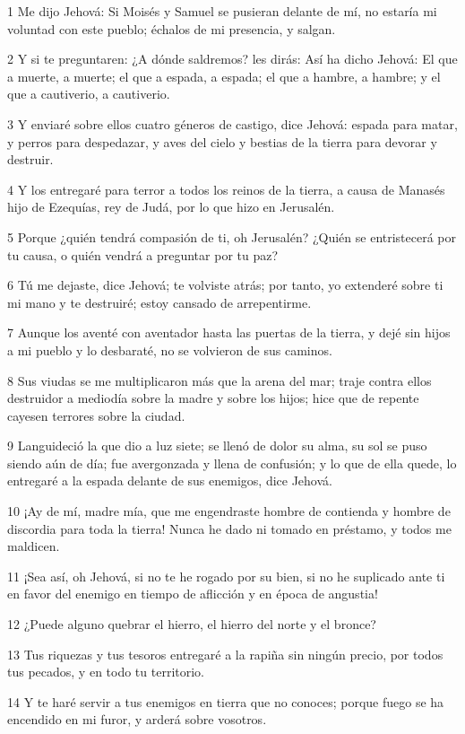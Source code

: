 \par 1 Me dijo Jehová: Si Moisés y Samuel se pusieran delante de mí, no estaría mi voluntad con este pueblo; échalos de mi presencia, y salgan.
\par 2 Y si te preguntaren: ¿A dónde saldremos? les dirás: Así ha dicho Jehová: El que a muerte, a muerte; el que a espada, a espada; el que a hambre, a hambre; y el que a cautiverio, a cautiverio. 
\par 3 Y enviaré sobre ellos cuatro géneros de castigo, dice Jehová: espada para matar, y perros para despedazar, y aves del cielo y bestias de la tierra para devorar y destruir. 
\par 4 Y los entregaré para terror a todos los reinos de la tierra, a causa de Manasés hijo de Ezequías, rey de Judá, por lo que hizo en Jerusalén. 
\par 5 Porque ¿quién tendrá compasión de ti, oh Jerusalén? ¿Quién se entristecerá por tu causa, o quién vendrá a preguntar por tu paz?
\par 6 Tú me dejaste, dice Jehová; te volviste atrás; por tanto, yo extenderé sobre ti mi mano y te destruiré; estoy cansado de arrepentirme.
\par 7 Aunque los aventé con aventador hasta las puertas de la tierra, y dejé sin hijos a mi pueblo y lo desbaraté, no se volvieron de sus caminos.
\par 8 Sus viudas se me multiplicaron más que la arena del mar; traje contra ellos destruidor a mediodía sobre la madre y sobre los hijos; hice que de repente cayesen terrores sobre la ciudad.
\par 9 Languideció la que dio a luz siete; se llenó de dolor su alma, su sol se puso siendo aún de día; fue avergonzada y llena de confusión; y lo que de ella quede, lo entregaré a la espada delante de sus enemigos, dice Jehová.
\par 10 ¡Ay de mí, madre mía, que me engendraste hombre de contienda y hombre de discordia para toda la tierra! Nunca he dado ni tomado en préstamo, y todos me maldicen.
\par 11 ¡Sea así, oh Jehová, si no te he rogado por su bien, si no he suplicado ante ti en favor del enemigo en tiempo de aflicción y en época de angustia!
\par 12 ¿Puede alguno quebrar el hierro, el hierro del norte y el bronce?
\par 13 Tus riquezas y tus tesoros entregaré a la rapiña sin ningún precio, por todos tus pecados, y en todo tu territorio.
\par 14 Y te haré servir a tus enemigos en tierra que no conoces; porque fuego se ha encendido en mi furor, y arderá sobre vosotros.

